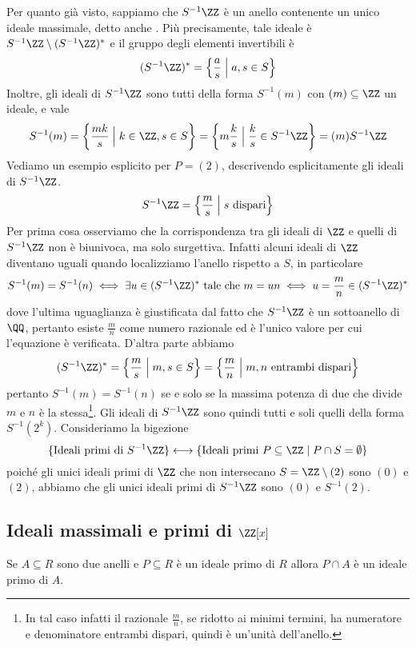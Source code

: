 \documentclass[11pt]{scrartcl}
\begin{document}
Per quanto già visto, sappiamo che $S^{-1}\ZZ$ è un anello contenente
un unico ideale massimale, detto anche . Più precisamente,
tale ideale è $S^{-1}\ZZ \setminus (S^{-1}\ZZ)^*$ e il gruppo degli elementi
invertibili è
\[
    (S^{-1}\ZZ)^* = \left\{\frac a s \Bigm| a, s \in S\right\}
\] 
Inoltre, gli ideali di $S^{-1}\ZZ$
sono tutti della forma $S^{-1}(m)$ con $(m)\subseteq \ZZ$ un ideale, e vale 
\[
    S^{-1}(m) = \left\{\frac{mk}{s} \Bigm|k \in \ZZ, s \in S\right\} = 
    \left\{m\frac k s\Bigm| \frac k s \in S^{-1}\ZZ\right\} = (m)S^{-1}\ZZ
\]
Vediamo un esempio esplicito per $P = (2)$, descrivendo esplicitamente gli 
ideali di $S^{-1}\ZZ$. 
\[
    S^{-1}\ZZ = \left\{\frac m s \Bigm| s \text{ dispari}\right\}
\]
Per prima cosa osserviamo che la corrispondenza tra 
gli ideali di $\ZZ$ e quelli di $S^{-1}\ZZ$ non è biunivoca, ma solo surgettiva.
Infatti alcuni ideali di $\ZZ$ diventano uguali quando localizziamo l'anello
rispetto a $S$, in particolare
\[
    S^{-1}(m) = S^{-1}(n) \iff \exists u \in (S^{-1}\ZZ)^* \text{ tale che }
    m = un \iff u = \frac m n \in (S^{-1}\ZZ)^*
\]
dove l'ultima uguaglianza è giustificata dal fatto che $S^{-1}\ZZ$ è un 
sottoanello di $\QQ$, pertanto esiste $\displaystyle\frac m n$ come numero
razionale ed è l'unico valore per cui l'equazione è verificata. D'altra parte
abbiamo 
\[
    (S^{-1}\ZZ)^* = \left\{\frac m s \Bigm| m, s \in S\right\} = 
    \left\{\frac m n \Bigm| m, n\text{ entrambi dispari}\right\}
\]
pertanto $S^{-1}(m) = S^{-1}(n)$ se e solo se la massima potenza di due che 
divide $m$ e $n$ è la stessa\footnote{
    In tal caso infatti il razionale $\frac m n$, se ridotto ai 
    minimi termini, ha numeratore e denominatore entrambi dispari, quindi
    è un'unità dell'anello.
}.
Gli ideali di $S^{-1}\ZZ$ sono quindi tutti e soli quelli della forma $S^{-1}(2^k)$.
Consideriamo la bigezione
\[
    \{\text{Ideali primi di }S^{-1}\ZZ\}\longleftrightarrow 
    \{\text{Ideali primi } P\subseteq \ZZ \mid P\cap S = \emptyset\}
\]
poiché gli unici ideali primi di $\ZZ$ che non intersecano $S = \ZZ\setminus(2)$
sono $(0)$ e $(2)$, abbiamo che gli unici ideali primi di $S^{-1}\ZZ$ sono
$(0)$ e $S^{-1}(2)$.

\newpage

\subsection{Ideali massimali e primi di $\ZZ[x]$}

\begin{lemma}
    \label{lemma2.3}
    Se $A \subseteq R$ sono due anelli e $P \subseteq R$ è un ideale primo
    di $R$ allora $P\cap A$ è un ideale primo di $A$.
\end{lemma}
\end{document}
